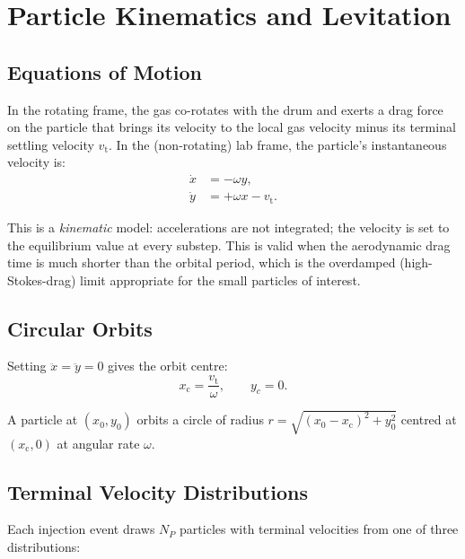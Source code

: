 \documentclass[12pt, a4paper]{article}
\newcommand{\vt}{v_{\mathrm{t}}}
\newcommand{\xc}{x_{\mathrm{c}}}
\newcommand{\omg}{\omega}
\begin{document}
\section{Particle Kinematics and Levitation}

\subsection{Equations of Motion}

In the rotating frame, the gas co-rotates with the drum and exerts a drag force
on the particle that brings its velocity to the local gas velocity minus its
terminal settling velocity $\vt$. In the (non-rotating) lab frame, the
particle's instantaneous velocity is:
\begin{align}
  \dot{x} &= -\omg y, \label{eq:vx} \\
  \dot{y} &= +\omg x - \vt. \label{eq:vy}
\end{align}

This is a \emph{kinematic} model: accelerations are not integrated; the
velocity is set to the equilibrium value at every substep. This is valid when
the aerodynamic drag time is much shorter than the orbital period, which is
the overdamped (high-Stokes-drag) limit appropriate for the small particles
of interest.

\subsection{Circular Orbits}

Setting $\ddot{x} = \ddot{y} = 0$ gives the orbit centre:
\begin{equation}
  \boxed{\xc = \frac{\vt}{\omg}, \qquad y_c = 0.}
  \label{eq:orbit_centre}
\end{equation}

A particle at $(x_0, y_0)$ orbits a circle of radius
$r = \sqrt{(x_0 - \xc)^2 + y_0^2}$
centred at $(\xc, 0)$ at angular rate $\omg$.

\subsection{Terminal Velocity Distributions}

Each injection event draws $N_P$ particles with terminal velocities from one
of three distributions:
\end{document}
